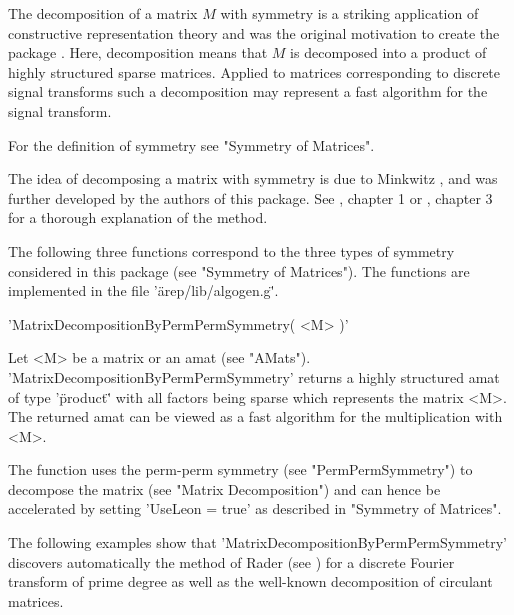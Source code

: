 
The decomposition of a matrix $M$ with symmetry is a striking 
application of constructive representation theory and was the 
original motivation to create the package {\AREP}. 
Here, decomposition means that $M$ is decomposed into a 
product of highly structured sparse matrices. 
Applied to matrices corresponding to discrete signal transforms
such a decomposition may represent a fast algorithm for the
signal transform.

For the definition of symmetry see "Symmetry of Matrices".

The idea of decomposing a matrix with symmetry is due to Minkwitz
\cite{Min95}, \cite{Min93} and was further developed by the authors
of this package. See \cite{Egn97}, chapter 1 or \cite{Pue98}, chapter 3
for a thorough explanation of the method.

The following three functions correspond to the three types 
of symmetry considered in this package (see "Symmetry of Matrices").
The functions are implemented in the file '\"arep/lib/algogen.g\"'.


'MatrixDecompositionByPermPermSymmetry( <M> )'

Let <M> be a matrix or an amat (see "AMats"). 
'MatrixDecompositionByPermPermSymmetry' returns a highly
structured amat of type '\"product\"' with all factors being
sparse which represents the matrix <M>. The returned amat 
can be viewed as a fast algorithm for the multiplication
with <M>.

The function uses the perm-perm symmetry (see "PermPermSymmetry")
to decompose the matrix (see "Matrix Decomposition") and 
can hence be accelerated by setting 'UseLeon \:= true'
as described in "Symmetry of Matrices".

The following examples show that 'MatrixDecompositionByPermPermSymmetry'
discovers automatically the method of Rader (see \cite{Rad68}) 
for a discrete Fourier transform of prime degree as well as 
the well-known decomposition of circulant matrices.

